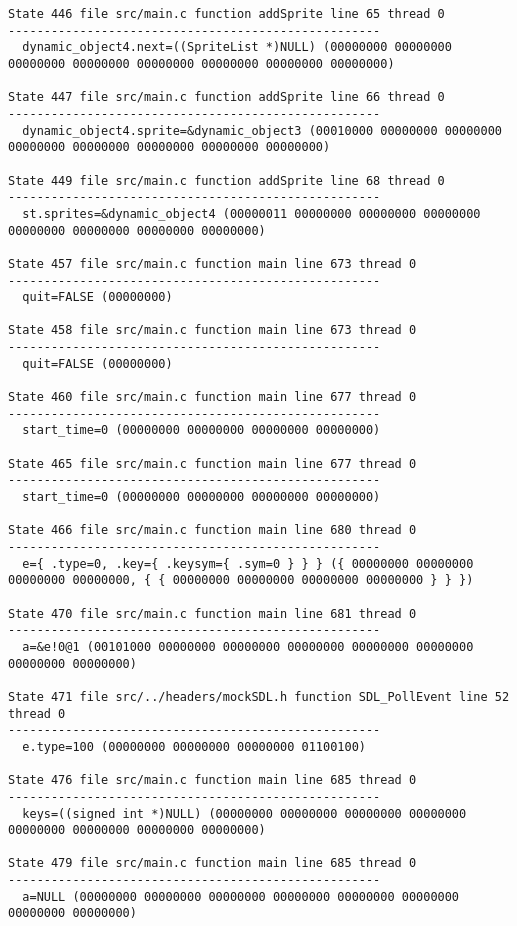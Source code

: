 \begin{verbatim}
State 446 file src/main.c function addSprite line 65 thread 0
----------------------------------------------------
  dynamic_object4.next=((SpriteList *)NULL) (00000000 00000000 00000000 00000000 00000000 00000000 00000000 00000000)

State 447 file src/main.c function addSprite line 66 thread 0
----------------------------------------------------
  dynamic_object4.sprite=&dynamic_object3 (00010000 00000000 00000000 00000000 00000000 00000000 00000000 00000000)

State 449 file src/main.c function addSprite line 68 thread 0
----------------------------------------------------
  st.sprites=&dynamic_object4 (00000011 00000000 00000000 00000000 00000000 00000000 00000000 00000000)

State 457 file src/main.c function main line 673 thread 0
----------------------------------------------------
  quit=FALSE (00000000)

State 458 file src/main.c function main line 673 thread 0
----------------------------------------------------
  quit=FALSE (00000000)

State 460 file src/main.c function main line 677 thread 0
----------------------------------------------------
  start_time=0 (00000000 00000000 00000000 00000000)

State 465 file src/main.c function main line 677 thread 0
----------------------------------------------------
  start_time=0 (00000000 00000000 00000000 00000000)

State 466 file src/main.c function main line 680 thread 0
----------------------------------------------------
  e={ .type=0, .key={ .keysym={ .sym=0 } } } ({ 00000000 00000000 00000000 00000000, { { 00000000 00000000 00000000 00000000 } } })

State 470 file src/main.c function main line 681 thread 0
----------------------------------------------------
  a=&e!0@1 (00101000 00000000 00000000 00000000 00000000 00000000 00000000 00000000)

State 471 file src/../headers/mockSDL.h function SDL_PollEvent line 52 thread 0
----------------------------------------------------
  e.type=100 (00000000 00000000 00000000 01100100)

State 476 file src/main.c function main line 685 thread 0
----------------------------------------------------
  keys=((signed int *)NULL) (00000000 00000000 00000000 00000000 00000000 00000000 00000000 00000000)

State 479 file src/main.c function main line 685 thread 0
----------------------------------------------------
  a=NULL (00000000 00000000 00000000 00000000 00000000 00000000 00000000 00000000)


\end{verbatim}
